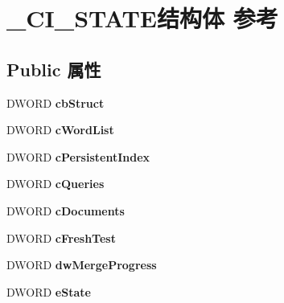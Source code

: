 \hypertarget{struct___c_i___s_t_a_t_e}{}\section{\+\_\+\+C\+I\+\_\+\+S\+T\+A\+T\+E结构体 参考}
\label{struct___c_i___s_t_a_t_e}
\subsection*{Public 属性}
\begin{DoxyCompactItemize}
\item 
\mbox{\label{struct___c_i___s_t_a_t_e_a4f727124f5c44beb645521db012fc19a}} 
D\+W\+O\+RD {\bfseries cb\+Struct}
\item 
\mbox{\label{struct___c_i___s_t_a_t_e_a4152a652a5d4d90679c1b204541b6a76}} 
D\+W\+O\+RD {\bfseries c\+Word\+List}
\item 
\mbox{\label{struct___c_i___s_t_a_t_e_ad044df6f9215d4862125abd047c20349}} 
D\+W\+O\+RD {\bfseries c\+Persistent\+Index}
\item 
\mbox{\label{struct___c_i___s_t_a_t_e_a5520b62eb53f531c85f8653bddcdf43a}} 
D\+W\+O\+RD {\bfseries c\+Queries}
\item 
\mbox{\label{struct___c_i___s_t_a_t_e_a3f99ac4376446ade0be02d9cbd19d3a4}} 
D\+W\+O\+RD {\bfseries c\+Documents}
\item 
\mbox{\label{struct___c_i___s_t_a_t_e_ada406927c59dc6e5b2fb2a2323a86965}} 
D\+W\+O\+RD {\bfseries c\+Fresh\+Test}
\item 
\mbox{\label{struct___c_i___s_t_a_t_e_ae571d30f00878148bcf71df060cd15a0}} 
D\+W\+O\+RD {\bfseries dw\+Merge\+Progress}
\item 
\mbox{\label{struct___c_i___s_t_a_t_e_a265ef2a855b963be76b99e019f9827ac}} 
D\+W\+O\+RD {\bfseries e\+State}
\item 
\mbox{\label{struct___c_i___s_t_a_t_e_a75744aa2bc31a545d78a96cb116eee4d}} 

\end{DoxyCompactItemize}
